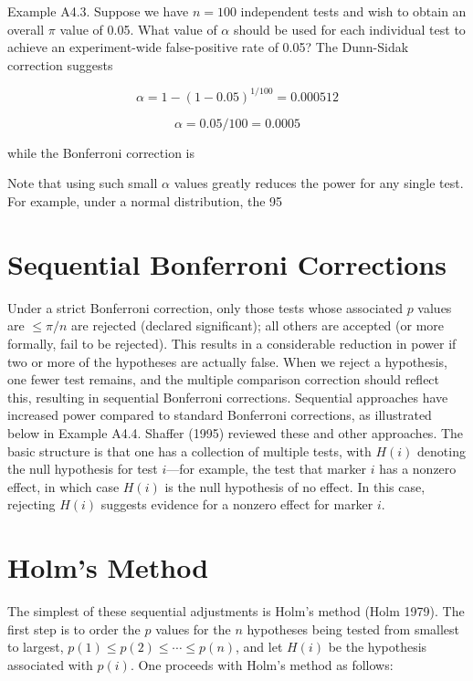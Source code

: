 \documentclass{article}
\begin{document}
Example A4.3. Suppose we have $n = 100$ independent tests and wish to obtain an overall $\pi$ value of 0.05. What value of $\alpha$ should be used for each individual test to achieve an experiment-wide false-positive rate of 0.05? The Dunn-Sidak correction suggests

\begin{equation}
\alpha=1-(1-0.05)^{1/100}=0.000512
\end{equation}

\begin{equation}
\alpha=0.05/100=0.0005
\end{equation}

while the Bonferroni correction is

Note that using such small  $ \alpha $ values greatly reduces the power for any single test. For example, under a normal distribution, the 95%

\section{Sequential Bonferroni Corrections}
Under a strict Bonferroni correction, only those tests whose associated $p$ values are $\leq \pi/n$ are rejected (declared significant); all others are accepted (or more formally, fail to be rejected). This results in a considerable reduction in power if two or more of the hypotheses are actually false. When we reject a hypothesis, one fewer test remains, and the multiple comparison correction should reflect this, resulting in sequential Bonferroni corrections. Sequential approaches have increased power compared to standard Bonferroni corrections, as illustrated below in Example A4.4. Shaffer (1995) reviewed these and other approaches. The basic structure is that one has a collection of multiple tests, with $H(i)$ denoting the null hypothesis for test $i$—for example, the test that marker $i$ has a nonzero effect, in which case $H(i)$ is the null hypothesis of no effect. In this case, rejecting $H(i)$ suggests evidence for a nonzero effect for marker $i$.

\section{Holm's Method}
The simplest of these sequential adjustments is Holm's method (Holm 1979). The first step is to order the $p$ values for the $n$ hypotheses being tested from smallest to largest, $p(1) \leq p(2) \leq \cdots \leq p(n)$, and let $H(i)$ be the hypothesis associated with $p(i)$. One proceeds with Holm's method as follows:
\end{document}
